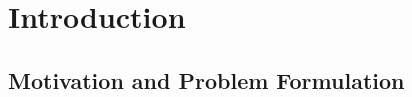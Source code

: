 \documentclass[letterpaper,10pt]{article}
\begin{document}










\section{Introduction}
\subsection{Motivation and Problem Formulation}
\end{document}
